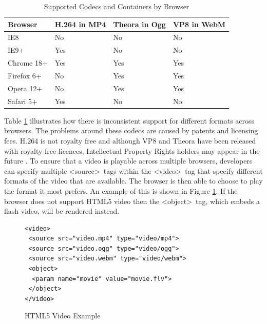 \documentclass[journal]{IEEEtran}
\begin{document}
\begin{table}
	\label{tab:supportedCodecsAndContainers}
	\caption{Supported Codecs and Containers by Browser}
    \begin{tabular}{|l|l|l|l|}
    \hline
    \textbf{Browser}    & \textbf{H.264 in MP4} & \textbf{Theora in Ogg} & \textbf{VP8 in WebM} \\ \hline
    IE8        & No           & No            & No          \\ \hline
    IE9+       & Yes          & No            & No          \\ \hline
    Chrome 18+ & Yes          & Yes           & Yes         \\ \hline
    Firefox 6+ & No           & Yes           & Yes         \\ \hline
    Opera 12+  & No           & Yes           & Yes         \\ \hline
    Safari 5+  & Yes          & No            & No          \\ \hline
    \end{tabular}
\end{table}

Table \ref{tab:supportedCodecsAndContainers} illustrates how there is inconsistent support for different formats across browsers. The problems around these codecs are caused by patents and licensing fees. H.264 is not royalty free and although VP8 and Theora have been released with royalty-free licences, Intellectual Property Rights holders may appear in the future \cite{article:towardsVideoOnTheWebWithHTML5} \cite{website:theoraBenefits}. To ensure that a video is playable across multiple browsers, developers can specify multiple \textless source\textgreater~tags within the \textless video\textgreater~tag that specify different formats of the video that are available. The browser is then able to choose to play the format it most prefers. An example of this is shown in Figure \ref{lst:HTML5VideoExample}. If the browser does not support HTML5 video then the \textless object\textgreater~tag, which embeds a flash video, will be rendered instead.

\begin{figure}
\label{lst:HTML5VideoExample}
\caption{HTML5 Video Example}
\begin{lstlisting}[frame=single]
<video>
 <source src="video.mp4" type="video/mp4">
 <source src="video.ogg" type="video/ogg">
 <source src="video.webm" type="video/webm">
 <object>
  <param name="movie" value="movie.flv">
 </object>
</video>
\end{lstlisting}
\end{figure}
\end{document}
